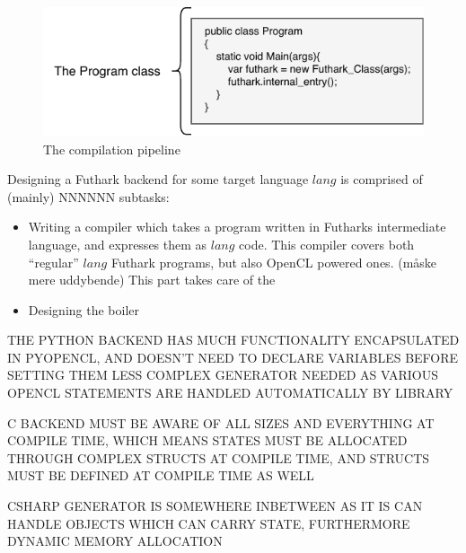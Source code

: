 \begin{figure}[h]
  \centering
  \includegraphics{chapters/figs/csharp/program_class.pdf}
  \caption{The \fshark{} compilation pipeline}
  \label{fig:programclass}
\end{figure}

Designing a Futhark backend for some target language $lang$ is comprised of (mainly) NNNNNN subtasks:
\begin{itemize}
\item Writing a compiler which takes a program written in Futharks
  intermediate language, and expresses them as $lang$ code.
  This compiler covers both ``regular'' $lang$ Futhark programs, but also OpenCL
  powered ones.
  (måske mere uddybende)
  This part takes care of the 

\item Designing the boiler
\end{itemize}


THE PYTHON BACKEND HAS MUCH FUNCTIONALITY ENCAPSULATED IN PYOPENCL, AND DOESN'T
NEED TO DECLARE VARIABLES BEFORE SETTING THEM
LESS COMPLEX GENERATOR NEEDED AS VARIOUS OPENCL STATEMENTS ARE HANDLED
AUTOMATICALLY BY LIBRARY

C BACKEND MUST BE AWARE OF ALL SIZES AND EVERYTHING AT COMPILE TIME, WHICH MEANS
STATES MUST BE ALLOCATED THROUGH COMPLEX STRUCTS AT COMPILE TIME, AND STRUCTS
MUST BE DEFINED AT COMPILE TIME AS WELL

CSHARP GENERATOR IS SOMEWHERE INBETWEEN AS IT IS CAN HANDLE OBJECTS WHICH CAN
CARRY STATE, FURTHERMORE DYNAMIC MEMORY ALLOCATION











